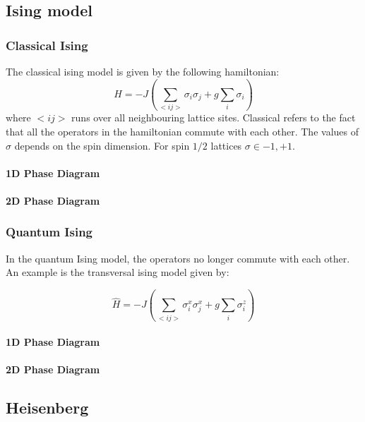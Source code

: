 \subsection{Ising model}

\subsubsection{Classical Ising}

The classical ising model is given by the following hamiltonian:
\begin{equation}
    H = -J \left (  \sum_{<i j>} \sigma_i \sigma_j + g\sum_i \sigma_i \right )
\end{equation}
where $<i j>$ runs over all neighbouring lattice sites. Classical refers to the fact that all the operators in the hamiltonian commute with each other. The values of $\sigma$ depends on the spin dimension. For spin $1/2$ lattices $\sigma \in {-1,+1}$.

\paragraph{1D Phase Diagram}

\paragraph{2D Phase Diagram}

\subsubsection{Quantum Ising}
In the quantum Ising model, the operators no longer commute with each other. An example is the transversal ising model given by:

\begin{equation}
    \hat{H} = -J \left (  \sum_{<i j>} \sigma^x_i \sigma^x_j + g \sum_i \sigma^z_i \right )
\end{equation}

\paragraph{1D Phase Diagram}

\paragraph{2D Phase Diagram}


\subsection{Heisenberg}

